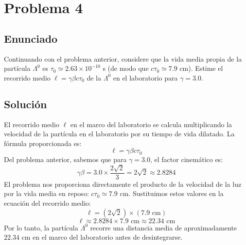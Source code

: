 \documentclass[a4paper,11pt]{article}
\begin{document}
\section{Problema 4}

\subsection{Enunciado}
Continuando con el problema anterior, considere que la vida media propia de la partícula $\Lambda^0$ es $\tau_0 \simeq 2.63 \times 10^{-10}$ s (de modo que $c\tau_0 \simeq 7.9$ cm). Estime el recorrido medio $\ell = \gamma \beta c \tau_0$ de la $\Lambda^0$ en el laboratorio para $\gamma = 3.0$.

\subsection{Solución}
El recorrido medio $\ell$ en el marco del laboratorio se calcula multiplicando la velocidad de la partícula en el laboratorio por su tiempo de vida dilatado. La fórmula proporcionada es:
$$ \ell = \gamma \beta c \tau_0 $$
Del problema anterior, sabemos que para $\gamma = 3.0$, el factor cinemático es:
$$ \gamma \beta = 3.0 \times \frac{2\sqrt{2}}{3} = 2\sqrt{2} \approx 2.8284 $$
El problema nos proporciona directamente el producto de la velocidad de la luz por la vida media en reposo: $c \tau_0 \simeq 7.9 \text{ cm}$.
Sustituimos estos valores en la ecuación del recorrido medio:
$$ \ell = (2\sqrt{2}) \times (7.9 \text{ cm}) $$
$$ \ell \approx 2.8284 \times 7.9 \text{ cm} \approx 22.34 \text{ cm} $$
Por lo tanto, la partícula $\Lambda^0$ recorre una distancia media de aproximadamente $22.34 \text{ cm}$ en el marco del laboratorio antes de desintegrarse.
\end{document}
